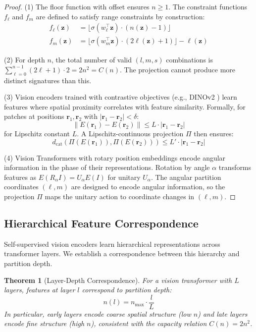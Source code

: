 \documentclass[11pt,twocolumn,a4paper]{article}
\newtheorem{theorem}{Theorem}[section]
\theoremstyle{definition}
\theoremstyle{remark}
\newcommand{\dcat}{d_{\mathrm{cat}}}
\begin{document}
\begin{proof}
(1) The floor function with offset ensures $n \geq 1$. The constraint functions $f_\ell$ and $f_m$ are defined to satisfy range constraints by construction:
\begin{align}
f_\ell(\mathbf{z}) &= \lfloor \sigma(w_\ell^\top \mathbf{z}) \cdot (n(\mathbf{z}) - 1) \rfloor \\
f_m(\mathbf{z}) &= \lfloor \sigma(w_m^\top \mathbf{z}) \cdot (2\ell(\mathbf{z}) + 1) \rfloor - \ell(\mathbf{z})
\end{align}

(2) For depth $n$, the total number of valid $(l, m, s)$ combinations is $\sum_{\ell=0}^{n-1} (2\ell + 1) \cdot 2 = 2n^2 = C(n)$. The projection cannot produce more distinct signatures than this.

(3) Vision encoders trained with contrastive objectives (e.g., DINOv2 \cite{Oquab2024}) learn features where spatial proximity correlates with feature similarity. Formally, for patches at positions $\mathbf{r}_1, \mathbf{r}_2$ with $|\mathbf{r}_1 - \mathbf{r}_2| < \delta$:
\begin{equation}
\|E(\mathbf{r}_1) - E(\mathbf{r}_2)\| \leq L \cdot |\mathbf{r}_1 - \mathbf{r}_2|
\end{equation}
for Lipschitz constant $L$. A Lipschitz-continuous projection $\Pi$ then ensures:
\begin{equation}
\dcat(\Pi(E(\mathbf{r}_1)), \Pi(E(\mathbf{r}_2))) \leq L' \cdot |\mathbf{r}_1 - \mathbf{r}_2|
\end{equation}

(4) Vision Transformers with rotary position embeddings encode angular information in the phase of their representations. Rotation by angle $\alpha$ transforms features as $E(R_\alpha I) = U_\alpha E(I)$ for unitary $U_\alpha$. The angular partition coordinates $(\ell, m)$ are designed to encode angular information, so the projection $\Pi$ maps the unitary action to coordinate changes in $(\ell, m)$.
\end{proof}

\subsection{Hierarchical Feature Correspondence}

Self-supervised vision encoders learn hierarchical representations across transformer layers. We establish a correspondence between this hierarchy and partition depth.

\begin{theorem}[Layer-Depth Correspondence]
\label{thm:layer_depth}
For a vision transformer with $L$ layers, features at layer $l$ correspond to partition depth:
\begin{equation}
n(l) = n_{\max} \cdot \frac{l}{L}
\end{equation}
In particular, early layers encode coarse spatial structure (low $n$) and late layers encode fine structure (high $n$), consistent with the capacity relation $C(n) = 2n^2$.
\end{theorem}
\end{document}
